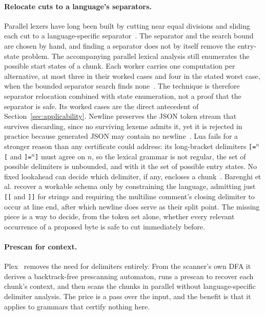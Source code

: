 \documentclass[11pt,a4paper]{article}
\theoremstyle{definition}
\theoremstyle{plain}
\newcommand{\code}[1]{\texttt{#1}}
\begin{document}
\paragraph{Relocate cuts to a language's separators.} Parallel lexers have long been built by cutting near equal
divisions and sliding each cut to a language-specific separator~\cite{barenghi2015parallel}. The separator and the
search bound are chosen by hand, and finding a separator does not by itself remove the entry-state problem. The
accompanying parallel lexical analysis still enumerates the possible start states of a chunk. Each worker carries one
computation per alternative, at most three in their worked cases and four in the stated worst case, when the bounded
separator search finds none~\cite{barenghi2015parallel}. The technique is therefore separator relocation combined with
state enumeration, not a proof that the separator is safe. Its worked cases are the direct antecedent of
Section~\ref{sec:applicability}. Newline preserves the JSON token stream that survives discarding, since no surviving
lexeme admits it, yet it is rejected in practice because generated JSON may contain no newline~\cite{li2021plex}. Lua
fails for a stronger reason than any certificate could address: its long-bracket delimiters \code{[=$^n$[} and
\code{]=$^n$]} must agree on $n$, so the lexical grammar is not regular, the set of possible delimiters is unbounded,
and with it the set of possible entry states. No fixed lookahead can decide which delimiter, if any, encloses a
chunk~\cite{barenghi2015parallel}. Barenghi et al. recover a workable schema only by constraining the language,
admitting just \code{[[} and \code{]]} for strings and requiring the multiline comment's closing delimiter to occur at
line end, after which newline does serve as their split point. The missing piece is a way to decide, from the token set
alone, whether every relevant occurrence of a proposed byte is safe to cut immediately before.

\paragraph{Prescan for context.} Plex~\cite{li2021plex} removes the need for delimiters entirely. From the scanner's own
DFA it derives a backtrack-free prescanning automaton, runs a prescan to recover each chunk's context, and then scans
the chunks in parallel without language-specific delimiter analysis. The price is a pass over the input, and the benefit
is that it applies to grammars that certify nothing here.
\end{document}

